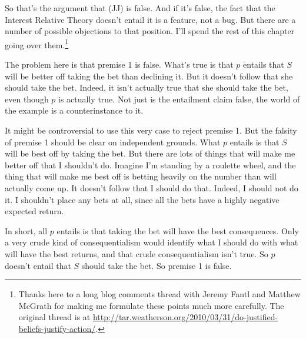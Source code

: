 So that's the argument that (JJ) is false. And if it's false, the fact that the Interest Relative Theory doesn't entail it is a feature, not a bug. But there are a number of possible objections to that position. I'll spend the rest of this chapter going over them.\footnote{Thanks here to a long blog comments thread with Jeremy Fantl and Matthew McGrath for making me formulate these points much more carefully. The original thread is at \url{http://tar.weatherson.org/2010/03/31/do-justified-beliefs-justify-action/}.}


{The problem here is that premise 1 is false. What's true is that \(p\) entails that \(S\) will be better off taking the bet than declining it. But it doesn't follow that she should take the bet. Indeed, it isn't actually true that she should take the bet, even though \(p\) is actually true. Not just is the entailment claim false, the world of the example is a counterinstance to it.

It might be controversial to use this very case to reject premise 1. But the falsity of premise 1 should be clear on independent grounds. What \(p\) entails is that \(S\) will be best off by taking the bet. But there are lots of things that will make me better off that I shouldn't do.  Imagine I'm standing by a roulette wheel, and the thing that will make me best off is betting heavily on the number than will actually come up. It doesn't follow that I should do that. Indeed, I should not do it. I shouldn't place any bets at all, since all the bets have a highly negative expected return. 

In short, all \(p\) entails is that taking the bet will have the best consequences. Only a very crude kind of consequentialism would identify what I should do with what will have the best returns, and that crude consequentialism isn't true. So \(p\) doesn't entail that \(S\) should take the bet. So premise 1 is false.}

